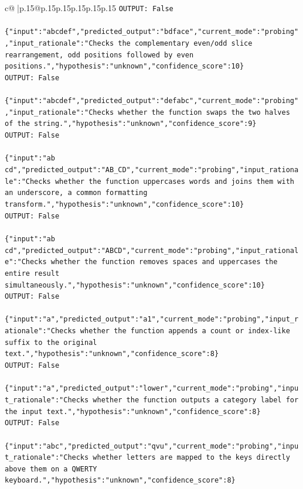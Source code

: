 \documentclass{article}
\begin{document}
{\begin{supertabular}{c@{$\;$}|p{.15\linewidth}@{}p{.15\linewidth}p{.15\linewidth}p{.15\linewidth}p{.15\linewidth}p{.15\linewidth}}
{{{\texttt{OUTPUT: False} \\
\\ 
\texttt{\{"input":"abcdef","predicted\_output":"bdface","current\_mode":"probing","input\_rationale":"Checks the complementary even/odd slice rearrangement, odd positions followed by even positions.","hypothesis":"unknown","confidence\_score":10\}} \\
\texttt{OUTPUT: False} \\
\\ 
\texttt{\{"input":"abcdef","predicted\_output":"defabc","current\_mode":"probing","input\_rationale":"Checks whether the function swaps the two halves of the string.","hypothesis":"unknown","confidence\_score":9\}} \\
\texttt{OUTPUT: False} \\
\\ 
\texttt{\{"input":"ab cd","predicted\_output":"AB\_CD","current\_mode":"probing","input\_rationale":"Checks whether the function uppercases words and joins them with an underscore, a common formatting transform.","hypothesis":"unknown","confidence\_score":10\}} \\
\texttt{OUTPUT: False} \\
\\ 
\texttt{\{"input":"ab cd","predicted\_output":"ABCD","current\_mode":"probing","input\_rationale":"Checks whether the function removes spaces and uppercases the entire result simultaneously.","hypothesis":"unknown","confidence\_score":10\}} \\
\texttt{OUTPUT: False} \\
\\ 
\texttt{\{"input":"a","predicted\_output":"a1","current\_mode":"probing","input\_rationale":"Checks whether the function appends a count or index{-}like suffix to the original text.","hypothesis":"unknown","confidence\_score":8\}} \\
\texttt{OUTPUT: False} \\
\\ 
\texttt{\{"input":"a","predicted\_output":"lower","current\_mode":"probing","input\_rationale":"Checks whether the function outputs a category label for the input text.","hypothesis":"unknown","confidence\_score":8\}} \\
\texttt{OUTPUT: False} \\
\\ 
\texttt{\{"input":"abc","predicted\_output":"qvu","current\_mode":"probing","input\_rationale":"Checks whether letters are mapped to the keys directly above them on a QWERTY keyboard.","hypothesis":"unknown","confidence\_score":8\}} \\
}}}
\end{supertabular}}
\end{document}
